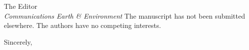 \documentclass[11pt]{letter}
\begin{document}
\begin{letter}{The Editor \\ \textit{Communications Earth \& Environment}}
The manuscript has not been submitted elsewhere. The authors have no competing interests.

\closing{Sincerely,}

\end{letter}
\end{document}
